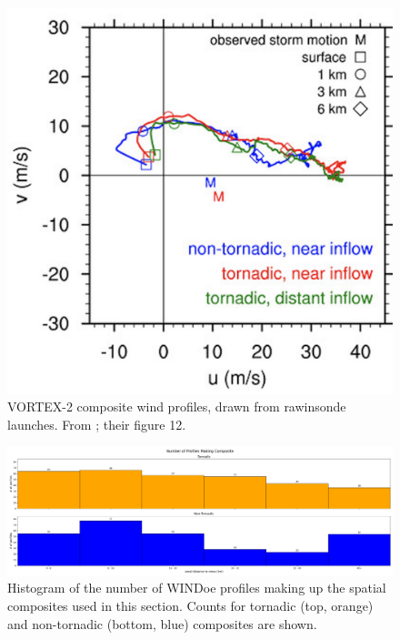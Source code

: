 \begin{figure}[h!]
    \centering
    \includegraphics[width = 1\textwidth]{Figures/parker_composite.png}
    \caption{VORTEX-2 composite wind profiles, drawn from rawinsonde launches. From \cite{parker2014composite}; their figure 12.}
    \label{fig:parker_comp}
\end{figure}

\begin{figure}[h!]
    \centering
    \includegraphics[width = 1\textwidth]{Figures/spatial_nprofs.png}
    \caption{Histogram of the number of WINDoe profiles making up the spatial composites used in this section. Counts for tornadic (top, orange) and non-tornadic (bottom, blue) composites are shown.}
    \label{fig:space_nprofs}
\end{figure}

